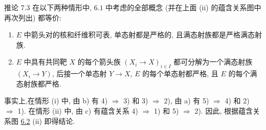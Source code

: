 \begin{enonce*}{推论 7.3}
在以下两种情形中, $\hyperref[I.def6.1]{6.1}$ 中考虑的全部概念
(并在上面 {\rm(ii)} 的蕴含关系图中再次列出) 都等价:
\begin{enumerate}
\renewcommand{\theenumi}{\roman{enumi}}
\renewcommand{\labelenumi}{(\theenumi)}
\item $E$ 中箭头对的核和纤维积可表, 单态射都是严格的,
且满态射族都是严格满态射族.

\item $E$ 中具有共同靶 $X$ 的每个箭头族 $(X_i\rightarrow X)_{i\in I}$
都可分解为一个满态射族 $(X_i\rightarrow Y)$,
后接一个单态射 $Y\rightarrow X$,
$E$ 的每个单态射都严格, 且 $E$ 的每个满态射族都严格.
\end{enumerate}
\end{enonce*}

事实上,\pageoriginale 在情形 (i) 中, 由 b) 有 4) $\Rightarrow$ 3)
和 3) $\Rightarrow$ 2), 由 a) 有 5) $\Rightarrow$ 4)
和 2) $\Rightarrow$ 1). 在情形 (ii) 中, 由 c) 有蕴含关系
4) $\Rightarrow$ 1) 和 5) $\Rightarrow$ 2).
因此, 根据蕴含关系图 \hyperref[I.prop6.2]{6.2} (ii) 即得结论.

